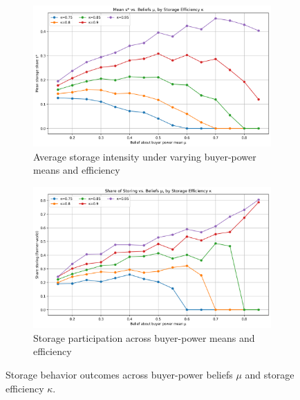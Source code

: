 \begin{figure}[ht!]
    \centering
    \begin{subfigure}[t]{0.48\linewidth}
        \centering
        \includegraphics[width=\linewidth]{model_figures/storage_subsidy_mean_s.png}
        \caption{Average storage intensity under varying buyer-power means and efficiency}
        \label{fig:storage_subsidy_mean_s}
    \end{subfigure}\hfill
    \begin{subfigure}[t]{0.48\linewidth}
        \centering
        \includegraphics[width=\linewidth]{model_figures/storage_subsidy_share_of_storage.png}
        \caption{Storage participation across buyer-power means and efficiency}
        \label{fig:storage_subsidy_share_of_storage}
    \end{subfigure}
    \caption{Storage behavior outcomes across buyer-power beliefs $\mu$ and storage efficiency $\kappa$.}
    \label{fig:storage_behavior_summary}
\end{figure}



